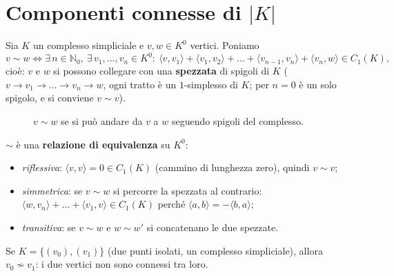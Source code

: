 \section{Componenti connesse di $|K|$}

Sia $K$ un complesso simpliciale e $v, w \in K^0$ vertici. Poniamo
\[
v \sim w \iff \exists\, n \in \mathbb{N}_0,\ \exists\, v_1, \dots, v_n \in K^0 : \ \langle v, v_1 \rangle + \langle v_1, v_2 \rangle + \dots + \langle v_{n-1}, v_n \rangle + \langle v_n, w \rangle \in C_1(K),
\]
cio\`e: $v$ e $w$ si possono collegare con una \textbf{spezzata} di spigoli di $K$ ($v \to v_1 \to \dots \to v_n \to w$, ogni tratto \`e un $1$-simplesso di $K$; per $n = 0$ \`e un solo spigolo, e si conviene $v \sim v$).

\begin{figure}[H]
    \centering
    \caption{$v \sim w$ se si pu\`o andare da $v$ a $w$ seguendo spigoli del complesso.}
\end{figure}

$\sim$ \`e una \textbf{relazione di equivalenza} su $K^0$:
\begin{itemize}
    \item \emph{riflessiva}: $\langle v, v \rangle = 0 \in C_1(K)$ (cammino di lunghezza zero), quindi $v \sim v$;
    \item \emph{simmetrica}: se $v \sim w$ si percorre la spezzata al contrario: $\langle w, v_n \rangle + \dots + \langle v_1, v \rangle \in C_1(K)$ perch\'e $\langle a, b \rangle = -\langle b, a \rangle$;
    \item \emph{transitiva}: se $v \sim w$ e $w \sim w'$ si concatenano le due spezzate.
\end{itemize}

\begin{observacion}
Se $K = \{ (v_0), (v_1) \}$ (due punti isolati, un complesso simpliciale), allora $v_0 \not\sim v_1$: i due vertici non sono connessi tra loro.
\end{observacion}

